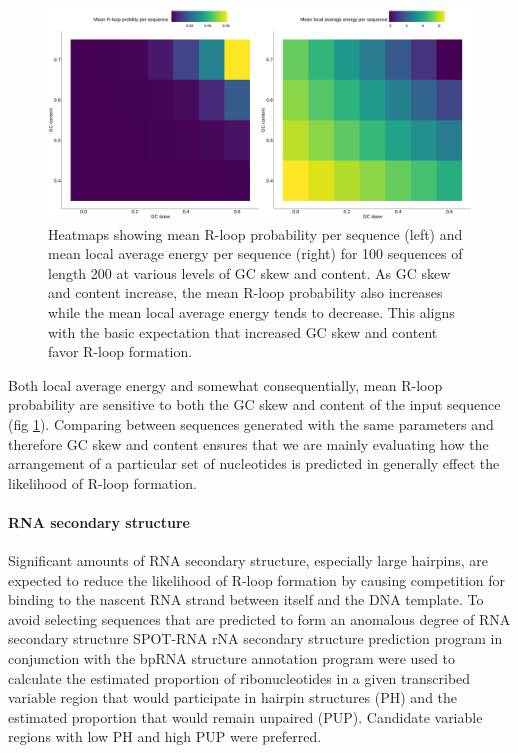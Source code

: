 \documentclass[11pt]{article}
\begin{document}
\begin{figure}[H]
	\includegraphics[width=14cm]{images/plots/rlooper_expect_tile.png}
	\centering
	\caption{Heatmaps showing mean R-loop probability per sequence (left) and mean local average energy per sequence (right) for 100 sequences of length 200 at various levels of GC skew and content. As GC skew and content increase, the mean R-loop probability also increases while the mean local average energy tends to decrease. This aligns with the basic expectation that increased GC skew and content favor R-loop formation.}
	\label{fig:rlooper-expect}
\end{figure}

Both local average energy and somewhat consequentially, mean R-loop probability are sensitive to both the GC skew and content of the input sequence (fig \ref{fig:rlooper-expect}). Comparing between sequences generated with the same parameters and therefore GC skew and content ensures that we are mainly evaluating how the arrangement of a particular set of nucleotides is predicted in generally effect the likelihood of R-loop formation.


\paragraph{RNA secondary structure}

Significant amounts of RNA secondary structure, especially large hairpins, are expected to reduce the likelihood of R-loop formation by causing competition for binding to the nascent RNA strand between itself and the DNA template. To avoid selecting sequences that are predicted to form an anomalous degree of RNA secondary structure SPOT-RNA rNA secondary structure prediction program in conjunction with the bpRNA structure annotation program \cite{Singh2019, Danaee2018} were used to calculate the estimated proportion of ribonucleotides in a given transcribed variable region that would participate in hairpin structures (PH) and the estimated proportion that would remain unpaired (PUP). Candidate variable regions with low PH and high PUP were preferred.
\end{document}
